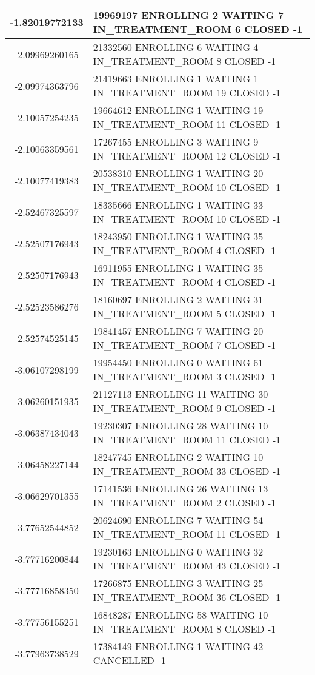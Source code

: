 {\begin{longtable}{|c|p{}|}
-1.82019772133 & 19969197 ENROLLING 2 WAITING 7 IN\_TREATMENT\_ROOM 6 CLOSED -1 \\
\hline
-2.09969260165 & 21332560 ENROLLING 6 WAITING 4 IN\_TREATMENT\_ROOM 8 CLOSED -1 \\
-2.09974363796 & 21419663 ENROLLING 1 WAITING 1 IN\_TREATMENT\_ROOM 19 CLOSED -1 \\
-2.10057254235 & 19664612 ENROLLING 1 WAITING 19 IN\_TREATMENT\_ROOM 11 CLOSED -1 \\
-2.10063359561 & 17267455 ENROLLING 3 WAITING 9 IN\_TREATMENT\_ROOM 12 CLOSED -1 \\
-2.10077419383 & 20538310 ENROLLING 1 WAITING 20 IN\_TREATMENT\_ROOM 10 CLOSED -1 \\
\hline
-2.52467325597 & 18335666 ENROLLING 1 WAITING 33 IN\_TREATMENT\_ROOM 10 CLOSED -1 \\
-2.52507176943 & 18243950 ENROLLING 1 WAITING 35 IN\_TREATMENT\_ROOM 4 CLOSED -1 \\
-2.52507176943 & 16911955 ENROLLING 1 WAITING 35 IN\_TREATMENT\_ROOM 4 CLOSED -1 \\
-2.52523586276 & 18160697 ENROLLING 2 WAITING 31 IN\_TREATMENT\_ROOM 5 CLOSED -1 \\
-2.52574525145 & 19841457 ENROLLING 7 WAITING 20 IN\_TREATMENT\_ROOM 7 CLOSED -1 \\
\hline
-3.06107298199 & 19954450 ENROLLING 0 WAITING 61 IN\_TREATMENT\_ROOM 3 CLOSED -1 \\
-3.06260151935 & 21127113 ENROLLING 11 WAITING 30 IN\_TREATMENT\_ROOM 9 CLOSED -1 \\
-3.06387434043 & 19230307 ENROLLING 28 WAITING 10 IN\_TREATMENT\_ROOM 11 CLOSED -1 \\
-3.06458227144 & 18247745 ENROLLING 2 WAITING 10 IN\_TREATMENT\_ROOM 33 CLOSED -1 \\
-3.06629701355 & 17141536 ENROLLING 26 WAITING 13 IN\_TREATMENT\_ROOM 2 CLOSED -1 \\
\hline
-3.77652544852 & 20624690 ENROLLING 7 WAITING 54 IN\_TREATMENT\_ROOM 11 CLOSED -1 \\
-3.77716200844 & 19230163 ENROLLING 0 WAITING 32 IN\_TREATMENT\_ROOM 43 CLOSED -1 \\
-3.77716858350 & 17266875 ENROLLING 3 WAITING 25 IN\_TREATMENT\_ROOM 36 CLOSED -1 \\
-3.77756155251 & 16848287 ENROLLING 58 WAITING 10 IN\_TREATMENT\_ROOM 8 CLOSED -1 \\
-3.77963738529 & 17384149 ENROLLING 1 WAITING 42 CANCELLED -1 \\

\end{longtable}}
